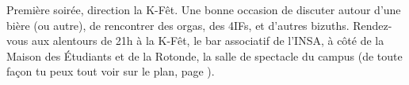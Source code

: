 Première soirée, direction la K-Fêt. Une bonne occasion de discuter autour
d'une bière (ou autre), de rencontrer des orgas, des 4IFs, et d'autres bizuths.
Rendez-vous aux alentours de 21h à la K-Fêt, le bar associatif de l'INSA, à
côté de la Maison des Étudiants et de la Rotonde, la salle de spectacle
du campus (de toute façon tu peux tout voir sur le plan, page \pageref{plan}).
